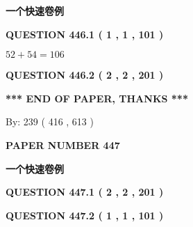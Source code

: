 \documentclass{ctexart}
\begin{document}
   
   
   
 \vspace{0.2in}
{\LARGE {\textbf{ 一个快速卷例}}}
   
   
  
\vspace{0.2in}
  
{\textbf{\Large{QUESTION
446.1 
 ( 1 , 1 , 101 )
}}}
  
  
 
 

$ %
52 +  %
54=   %
106$
 
 
  
\vspace{0.2in}
  
{\textbf{\Large{QUESTION
446.2 
 ( 2 , 2 , 201 )
}}}
  
  
   
   
 \vspace{0.2in}
 
   
   
   
   
\vspace{1.0in} 
{\textbf{\large{ *** END OF PAPER, THANKS *** }}} 
   
   
\hspace{1.0in} By: 
 239 ( 416 ,  613 )
   
   
   
   
\newpage 
\setcounter{page}{ 
   447001 } 
   
   
   
   
 {\textbf{ \Large{ PAPER NUMBER  447  }}}
   
   
\vspace{0.2in}
   
   
   
   
   
   
 \vspace{0.2in}
{\LARGE {\textbf{ 一个快速卷例}}}
   
   
  
\vspace{0.2in}
  
{\textbf{\Large{QUESTION
447.1 
 ( 2 , 2 , 201 )
}}}
  
  
  
\vspace{0.2in}
  
{\textbf{\Large{QUESTION
447.2 
 ( 1 , 1 , 101 )
}}}
  
  
 
\end{document}
